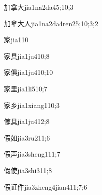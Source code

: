 \begin{verbete}{加拿大}{jia1na2da4}{5;10;3}
\end{verbete}

\begin{verbete}{加拿大人}{jia1na2da4ren2}{5;10;3;2}
\end{verbete}

\begin{verbete}{家}{jia1}{10}
\end{verbete}

\begin{verbete}{家具}{jia1ju4}{10;8}
\end{verbete}

\begin{verbete}{家俱}{jia1ju4}{10;10}
\end{verbete}

\begin{verbete}{家里}{jia1li5}{10;7}
\end{verbete}

\begin{verbete}{家乡}{jia1xiang1}{10;3}
\end{verbete}

\begin{verbete}{傢具}{jia1ju4}{12;8}
\end{verbete}

\begin{verbete}{假如}{jia3ru2}{11;6}
\end{verbete}

\begin{verbete}{假声}{jia3sheng1}{11;7}
\end{verbete}

\begin{verbete}{假使}{jia3shi3}{11;8}
\end{verbete}

\begin{verbete}{假证件}{jia3zheng4jian4}{11;7;6}
\end{verbete}

